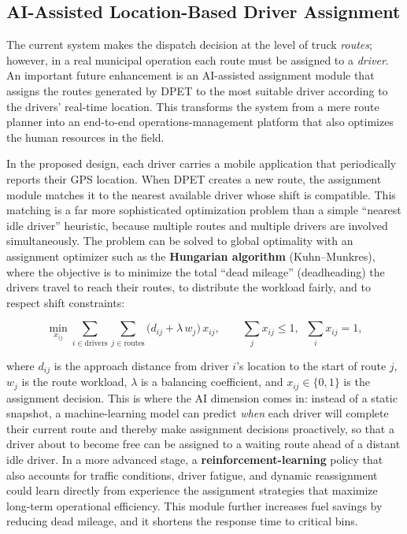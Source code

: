 \documentclass[12pt,a4paper]{report}
\begin{document}
\subsection{AI-Assisted Location-Based Driver Assignment}

\indent The current system makes the dispatch decision at the level of truck \textit{routes}; however, in a real municipal operation each route must be assigned to a \textit{driver}. An important future enhancement is an AI-assisted assignment module that assigns the routes generated by DPET to the most suitable driver according to the drivers' real-time location. This transforms the system from a mere route planner into an end-to-end operations-management platform that also optimizes the human resources in the field.

\indent In the proposed design, each driver carries a mobile application that periodically reports their GPS location. When DPET creates a new route, the assignment module matches it to the nearest available driver whose shift is compatible. This matching is a far more sophisticated optimization problem than a simple ``nearest idle driver'' heuristic, because multiple routes and multiple drivers are involved simultaneously. The problem can be solved to global optimality with an assignment optimizer such as the \textbf{Hungarian algorithm} (Kuhn--Munkres), where the objective is to minimize the total ``dead mileage'' (deadheading) the drivers travel to reach their routes, to distribute the workload fairly, and to respect shift constraints:

\begin{equation}
\min_{x_{ij}} \sum_{i \in \text{drivers}} \sum_{j \in \text{routes}} \bigl( d_{ij} + \lambda\,w_{j} \bigr)\, x_{ij},
\qquad \sum_{j} x_{ij} \leq 1,\;\; \sum_{i} x_{ij} = 1,
\label{eq:driver_assignment}
\end{equation}

\indent where $d_{ij}$ is the approach distance from driver $i$'s location to the start of route $j$, $w_{j}$ is the route workload, $\lambda$ is a balancing coefficient, and $x_{ij}\in\{0,1\}$ is the assignment decision. This is where the AI dimension comes in: instead of a static snapshot, a machine-learning model can predict \textit{when} each driver will complete their current route and thereby make assignment decisions proactively, so that a driver about to become free can be assigned to a waiting route ahead of a distant idle driver. In a more advanced stage, a \textbf{reinforcement-learning} policy that also accounts for traffic conditions, driver fatigue, and dynamic reassignment could learn directly from experience the assignment strategies that maximize long-term operational efficiency. This module further increases fuel savings by reducing dead mileage, and it shortens the response time to critical bins.
\end{document}
